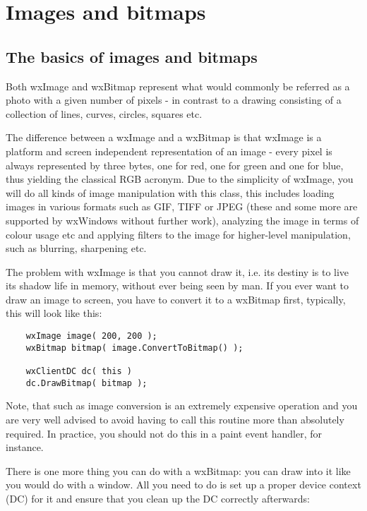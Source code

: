 \chapter{Images and bitmaps}\label{chapimages}
%
%
\setfooter{\thepage}{}{}{}{}{\thepage}%

\section{The basics of images and bitmaps}

Both wxImage and wxBitmap represent what would commonly be referred as
a photo with a given number of pixels - in contrast to a drawing consisting
of a collection of lines, curves, circles, squares etc.

The difference between a wxImage and a wxBitmap is that wxImage is a
platform and screen independent representation of an image - every
pixel is always represented by three bytes, one for red, one for green
and one for blue, thus yielding the classical RGB acronym. Due to the
simplicity of wxImage, you will do all kinds of image manipulation
with this class, this includes loading images in various formats
such as GIF, TIFF or JPEG (these and some more are supported by wxWindows 
without further work), analyzing the image in terms of colour usage etc
and applying filters to the image for higher-level manipulation, such
as blurring, sharpening etc.

The problem with wxImage is that you cannot draw it, i.e. its destiny
is to live its shadow life in memory, without ever being seen by man.
If you ever want to draw an image to screen, you have to convert it
to a wxBitmap first, typically, this will look like this:

\begin{verbatim}
    wxImage image( 200, 200 );
    wxBitmap bitmap( image.ConvertToBitmap() );
    
    wxClientDC dc( this )
    dc.DrawBitmap( bitmap );
\end{verbatim}

Note, that such as image conversion is an extremely expensive operation
and you are very well advised to avoid having to call this routine
more than absolutely required. In practice, you should not do this
in a paint event handler, for instance.

There is one more thing you can do with a wxBitmap: you can draw into
it like you would do with a window. All you need to do is set up a
proper device context (DC) for it and ensure that you clean up the
DC correctly afterwards:

